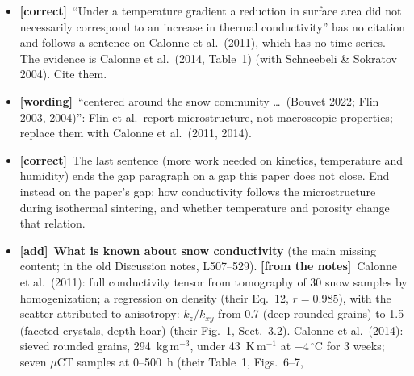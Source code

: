 \documentclass[11pt]{article}
\newcommand{\Note}{\textcolor{open}{\textbf{[from the notes]}}\ }
\newcommand{\tC}{\textcolor{miss}{\textbf{[correct]}}\ }
\newcommand{\tG}{\textcolor{stale}{\textbf{[wording]}}\ }
\newcommand{\tA}{\textcolor{have}{\textbf{[add]}}\ }
\newcommand{\add}[1]{\textcolor{revX}{#1}}
\begin{document}
\begin{enumerate}
\begin{itemize}
{    density: 0.078$\to$0.081 and 0.37$\to$0.42~W\,m$^{-1}$\,K$^{-1}$,
    ``changes are rather small''. The draft's ``How isothermal metamorphism
    influences the macroscopic properties in the absence of compaction is
    still unquantified'' is therefore contradicted. What remains open, and
    is this paper's: packings of grains sintering from point contacts, not
    natural snow; conductivity against SSA; and its dependence on
    temperature and initial porosity. This is the most important correction
    in the Introduction, because a referee from the snow community will know
    Bouvet et al.}
  \item \add{\tC ``Under a temperature gradient a reduction in surface area
    did not necessarily correspond to an increase in thermal conductivity''
    has no citation and follows a sentence on Calonne et al.\ (2011), which
    has no time series. The evidence is Calonne et al.\ (2014, Table~1) (with
    Schneebeli \& Sokratov 2004). Cite them.}
  \item \add{\tG ``centered around the snow community \ldots\ (Bouvet 2022;
    Flin 2003, 2004)'': Flin et al.\ report microstructure, not
    macroscopic properties; replace them with Calonne et al.\ (2011, 2014).}
  \item \tC The last sentence (more work needed on kinetics, temperature and
    humidity) ends the gap paragraph on a gap this paper does not close.
    End instead on the paper's gap: how conductivity follows the
    microstructure during isothermal sintering, and whether temperature and
    porosity change that relation.
  \item \tA \textbf{What is known about snow conductivity} (the main missing
    content; in the old Discussion notes, L507--529). \Note Calonne et al.\
    (2011): full conductivity tensor from tomography of 30 snow samples by
    homogenization; a regression on density (their Eq.~12, $r = 0.985$),
    with the scatter attributed to anisotropy: $k_z/k_{xy}$ from 0.7 (deep
    rounded grains) to 1.5 (faceted crystals, depth hoar) (their Fig.~1,
    Sect.~3.2). Calonne et al.\ (2014): sieved rounded grains,
    294~kg\,m$^{-3}$, under 43~K\,m$^{-1}$ at $-4\,^\circ$C for 3 weeks;
    seven $\mu$CT samples at 0--500~h (their Table~1, Figs.~6--7,

\end{itemize}
\end{enumerate}
\end{document}
